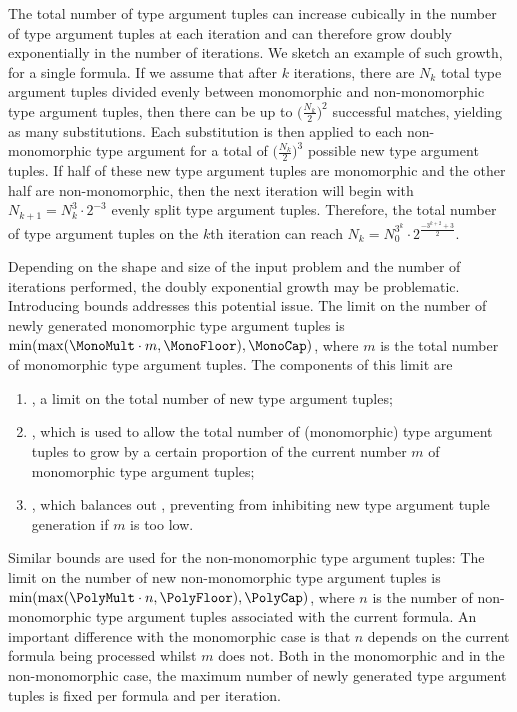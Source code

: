 \documentclass[runningheads]{llncs}
\begin{document}
The total number of type argument tuples can increase cubically in the number of type argument tuples at each iteration and can therefore grow doubly exponentially in the number of iterations. We sketch an example of such growth, for a single formula. If we assume that after \(k\) iterations, there are \(N_k\) total type argument tuples divided evenly between monomorphic and non-monomorphic type argument tuples, then there can be up to \(\bigl(\frac{N_k}{2}\bigr)^2\) successful matches, yielding as many substitutions. Each substitution is then applied to each non-monomorphic type argument for a total of \(\bigl(\frac{N_k}{2}\bigr)^3\) possible new type argument tuples. If half of these new type argument tuples are monomorphic and the other half are non-monomorphic, then the next iteration will begin with \(N_{k+1} = N_k^3 \cdot 2^{-3}\) evenly split type argument tuples. Therefore, the total number of type argument tuples on the \(k\)th iteration can reach \(N_k = N_0^{3^k} \cdot 2^{\frac{-3^{k+2}+3}{2}}\).

   Depending on the shape and size of the input problem and the number of iterations performed, the doubly exponential growth may be problematic. Introducing bounds addresses this potential issue. The limit on the number of newly generated monomorphic type argument tuples is \(\min(\max(\MonoMult\cdot m, \MonoFloor), \MonoCap)\), where \(m\) is the total number of monomorphic type argument tuples. The components of this limit are
\begin{enumerate}
   \item \MonoCap, a %
   limit on the total number of new type argument tuples;
   \item \MonoMult, which is used to allow the total number of (monomorphic) type argument tuples to grow by a certain proportion of the current number \(m\) of monomorphic type argument tuples;
   \item \MonoFloor, which balances out \MonoMult, preventing \MonoMult from inhibiting new type argument tuple generation if \(m\) is too low.
\end{enumerate}

Similar bounds are used for the non-monomorphic type argument tuples:
The limit on the number of new non-monomorphic type argument tuples is \(\min(\max(\PolyMult\cdot n, \PolyFloor),\allowbreak \PolyCap)\), where \(n\) is the number of non-monomorphic type argument tuples associated with the current formula. An important difference with the monomorphic case is that \(n\) depends on the current formula being processed whilst \(m\) does not.
Both in the monomorphic and in the non-monomorphic case, the maximum number of newly generated type argument tuples is fixed per formula and per iteration.
\end{document}
